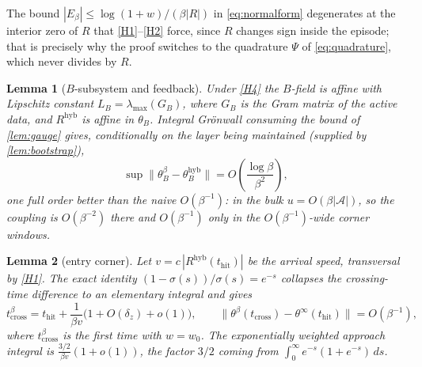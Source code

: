 \documentclass[11pt]{article}
\newtheorem{lemma}[lemma]{Lemma}
\theoremstyle{definition}
\theoremstyle{remark}
\newcommand{\thit}{t_{\mathrm{hit}}}
\newcommand{\Ar}{\mathcal{A}}                      %
\newcommand{\hyb}{\mathrm{hyb}}
\begin{document}
\noindent The bound $|E_\beta|\le\log(1+w)/(\beta|R|)$ in
\eqref{eq:normalform} degenerates at the interior zero of $R$ that
\eqref{H1}--\eqref{H2} force, since $R$ changes sign inside the episode; that
is precisely why the proof switches to the quadrature $\Psi$ of
\eqref{eq:quadrature}, which never divides by $R$.

\begin{lemma}[$B$-subsystem and feedback]\label{lem:gronwall}
Under \eqref{H4} the $B$-field is affine with Lipschitz constant
$L_B=\lambda_{\max}(G_B)$, where $G_B$ is the Gram matrix of the active data, and
$R^{\hyb}$ is affine in $\theta_B$. Integral Gr\"onwall consuming the bound of
\cref{lem:gauge} gives, conditionally on the layer being maintained (supplied by
\cref{lem:bootstrap}),
\begin{equation}\label{eq:Brate}
\sup\bigl\|\theta_B^\beta-\theta_B^{\hyb}\bigr\|=O\!\left(\frac{\log\beta}{\beta^{2}}\right),
\end{equation}
one full order better than the naive $O(\beta^{-1})$: in the bulk
$u=O(\beta|\Ar|)$, so the coupling is $O(\beta^{-2})$ there and $O(\beta^{-1})$
only in the $O(\beta^{-1})$-wide corner windows.
\end{lemma}

\begin{lemma}[entry corner]\label{lem:corner-in}
Let $v=c\,|R^{\hyb}(\thit)|$ be the arrival speed, transversal by \eqref{H1}. The
exact identity $(1-\sigma(s))/\sigma(s)=e^{-s}$ collapses the crossing-time
difference to an elementary integral and gives
\begin{equation}\label{eq:corner-in}
t_{\mathrm{cross}}^{\beta}=\thit+\frac{1}{\beta v}\bigl(1+O(\delta_z)+o(1)\bigr),
\qquad
\bigl\|\theta^\beta(t_{\mathrm{cross}})-\theta^\infty(\thit)\bigr\|=O(\beta^{-1}),
\end{equation}
where $t^\beta_{\mathrm{cross}}$ is the first time with $w=w_0$. The
exponentially weighted approach integral is $\tfrac{3/2}{\beta v}(1+o(1))$, the
factor $3/2$ coming from $\int_0^\infty e^{-s}(1+e^{-s})\,ds$.
\end{lemma}
\end{document}
